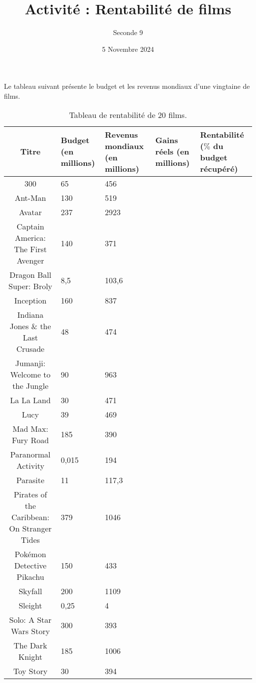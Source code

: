 \documentclass{article}
\title{Activité : Rentabilité de films}
\author{Seconde 9}
\date{5 Novembre 2024}
\begin{document}
\maketitle

Le tableau suivant présente le budget et les revenus mondiaux d'une vingtaine de films.
\begin{table}[h]
\centering
\begin{tabular}{|c|p{2cm}|p{2cm}|p{2cm}|p{2cm}|}
\hline
Titre & Budget (en millions) & Revenus mondiaux (en millions) & Gains réels (en millions) & Rentabilité ($\%$ du budget récupéré) \\ \hline
300 & 65 & 456 &  &\\ \hline
Ant-Man & 130 & 519 & & \\ \hline
Avatar & 237 & 2923 & & \\ \hline
Captain America: The First Avenger & 140 & 371 &  & \\ \hline
Dragon Ball Super: Broly & 8,5 & 103,6 & & \\ \hline
Inception & 160 & 837 & & \\ \hline
Indiana Jones \& the Last Crusade & 48 & 474 &  &\\ \hline
Jumanji: Welcome to the Jungle & 90 & 963 & & \\ \hline
La La Land & 30 & 471 & & \\ \hline
Lucy & 39 & 469 & & \\ \hline
Mad Max: Fury Road & 185 & 390 & &\\ \hline
Paranormal Activity & 0,015 & 194 & &\\ \hline
Parasite & 11 & 117,3 & &\\ \hline
Pirates of the Caribbean: On Stranger Tides & 379 & 1046 & &\\ \hline
Pokémon Detective Pikachu & 150 & 433 & &\\ \hline
Skyfall & 200 & 1109 & &\\ \hline
Sleight & 0,25 & 4 & &\\ \hline
Solo: A Star Wars Story & 300 & 393 & &\\ \hline
The Dark Knight & 185 & 1006 &  &\\ \hline
Toy Story & 30 & 394 &  &\\ \hline
\end{tabular}
\caption{Tableau de rentabilité de 20 films.
}
\label{tab:my-table}
\end{table}
\end{document}
